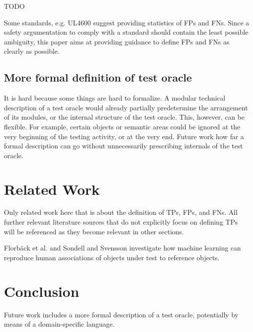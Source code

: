\documentclass[conference]{IEEEtran}
\begin{document}
TODO

Some standards, e.g. UL4600 \cite[Sec. 8.4.1.2]{UL4600_voting_2019} suggest providing statistics of FPs and FNs. 
Since a safety argumentation to comply with a standard should contain the least possible ambiguity, this paper aims at providing guidance to define FPs and FNs as clearly as possible. 



\subsection{More formal definition of test oracle}

It is hard because some things are hard to formalize.
A modular technical description of a test oracle would already partially predetermine the arrangement of its modules, or the internal structure of the test oracle. This, however, can be flexible. For example, certain objects or semantic areas could be ignored at the very beginning of the testing activity, or at the very end. 
Future work how far a formal description can go without unnecessarily prescribing internals of the test oracle. 



\section{Related Work}
\label{sec:related_work}

Only related work here that is about the definition of TPs, FPs, and FNs. 
All further relevant literature sources that do not explicitly focus on defining TPs will be referenced as they become relevant in other sections. 

Florbäck et al. \cite{Florbaeck2016.matching.offline} and Sondell and Svensson \cite{Sondell2018} investigate how machine learning can reproduce human associations of objects under test to reference objects.


\section{Conclusion}
\label{sec:conclusion}

Future work includes a more formal description of a test oracle, potentially by means of a domain-specific language.



%
% 
% 
% 
% 
% 


{\small


}
\end{document}
